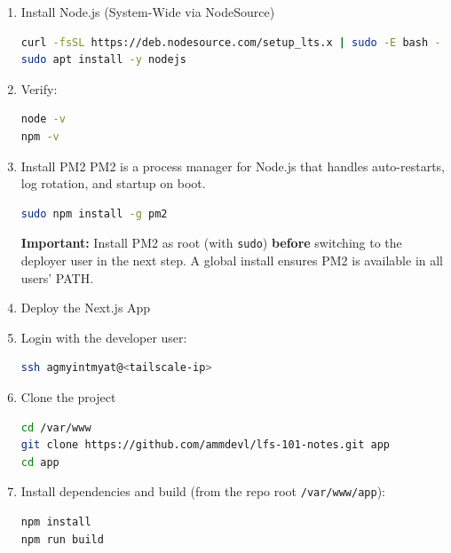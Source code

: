 \documentclass[12pt,a4paper]{report}
\begin{document}
\begin{enumerate}
\item Install Node.js (System-Wide via NodeSource)
\begin{lstlisting}[language=bash]
curl -fsSL https://deb.nodesource.com/setup_lts.x | sudo -E bash -
sudo apt install -y nodejs
\end{lstlisting}

\item Verify:
\begin{lstlisting}[language=bash]
node -v
npm -v
\end{lstlisting}

\item Install PM2
PM2 is a process manager for Node.js that handles auto-restarts, log rotation, and startup on boot.
\begin{lstlisting}[language=bash]
sudo npm install -g pm2
\end{lstlisting}
\begin{markdownnote}
\textbf{Important:} Install PM2 as root (with \texttt{sudo}) \textbf{before} switching to the deployer user in the next step. A global install ensures PM2 is available in all users' PATH.
\end{markdownnote}

\item Deploy the Next.js App
\item Login with the developer user:
\begin{lstlisting}[language=bash]
ssh agmyintmyat@<tailscale-ip>
\end{lstlisting}
\item Clone the project
\begin{lstlisting}[language=bash]
cd /var/www
git clone https://github.com/ammdevl/lfs-101-notes.git app
cd app
\end{lstlisting}
\item Install dependencies and build (from the repo root \texttt{/var/www/app}):
\begin{lstlisting}[language=bash]
npm install
npm run build
\end{lstlisting}


\end{enumerate}
\end{document}
